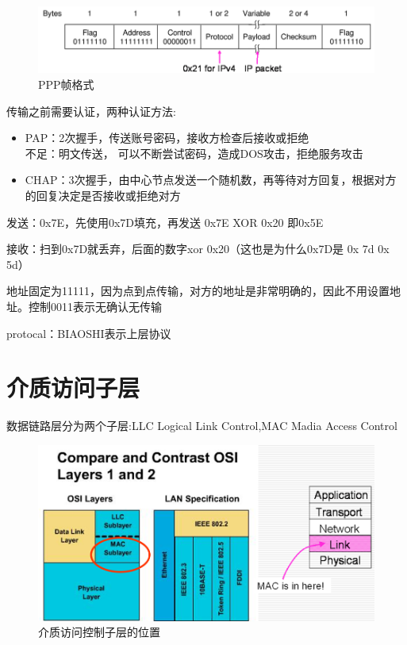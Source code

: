 \documentclass[UTF8,a4paper]{ctexart}
\begin{document}
\begin{figure}[H]
  \centering
  \includegraphics[scale = 0.3]{assets/jisuanjiwangluo_4ef98.png}
  \caption{PPP帧格式}
\end{figure}

传输之前需要认证，两种认证方法:
\begin{itemize}
  \item PAP：2次握手，传送账号密码，接收方检查后接收或拒绝\\
  不足：明文传送， 可以不断尝试密码，造成DOS攻击，拒绝服务攻击
  \item CHAP：3次握手，由中心节点发送一个随机数，再等待对方回复，根据对方的回复决定是否接收或拒绝对方
\end{itemize}

发送：0x7E，先使用0x7D填充，再发送 0x7E XOR 0x20 即0x5E

接收：扫到0x7D就丢弃，后面的数字xor 0x20（这也是为什么0x7D是 0x 7d 0x 5d）

地址固定为11111，因为点到点传输，对方的地址是非常明确的，因此不用设置地址。控制0011表示无确认无传输

protocal：BIAOSHI表示上层协议

\section{介质访问子层}
数据链路层分为两个子层:LLC Logical Link Control,MAC Madia Access Control
\begin{figure}[H]
  \centering
  \includegraphics[scale = 0.3]{assets/jisuanjiwangluo_d896b.png}
  \caption{介质访问控制子层的位置}
\end{figure}
\end{document}
